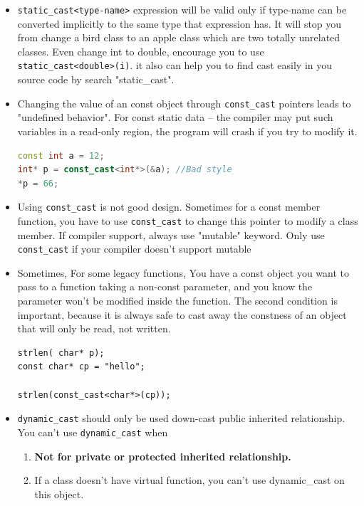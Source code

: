 \documentclass[a4paper,11pt,twoside]{book}
\begin{document}
\begin{itemize}
	\item \texttt{static\_cast<type-name>} expression will be valid only if type-name can be converted implicitly to the same type that expression has.  It will stop you from change a bird class to an apple class which  are two totally unrelated classes.  Even change int to double, encourage you to use \texttt{static\_cast<double>(i)}.  it also can help you to find cast easily in you source code by search "static\_cast".
	
	\item Changing the value of an const object through \texttt{const\_cast} pointers leads to  "undefined behavior". For const static data -- the compiler may put such variables in a read-only region, the program will crash if you try to modify it.
	
\begin{lstlisting}[frame=single, language=c++]
const int a = 12;
int* p = const_cast<int*>(&a); //Bad style
*p = 66;
\end{lstlisting}
	
	\item Using \texttt{const\_cast} is not good design. Sometimes for a const member function, you have to use \texttt{const\_cast} to change this pointer to modify a class member. If compiler support, always use "mutable"  keyword.  Only use \texttt{const\_cast} if your compiler doesn't support mutable
	
	\item Sometimes, For some legacy functions, You have a const object you want to pass to a function taking a non-const parameter, and you know the parameter won't be modified inside the function. The second condition is important, because it is always safe to cast away the constness of an object that will only be read, not written.
	
\begin{lstlisting}[numbers = none]
strlen( char* p);
const char* cp = "hello";

strlen(const_cast<char*>(cp));
\end{lstlisting}
	
	\item \texttt{dynamic\_cast} should only be used down-cast public inherited relationship. You can't use \texttt{dynamic\_cast} when
	\begin{enumerate}
		\item \textbf{Not for private or protected inherited relationship.}
		\item If a class doesn't have virtual function, you can't use dynamic\_cast on this object.
	\end{enumerate}
	

\end{itemize}
\end{document}
